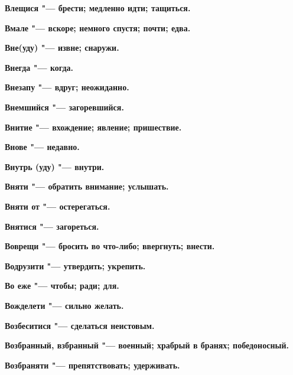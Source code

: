 \begin{mymulticols}{2}
\bfseries Влещися\normalfont{} "--- брести; медленно идти; тащиться. 




\bfseries Вмале\normalfont{} "--- вскоре; немного спустя; почти; едва. 




\bfseries Вне(уду)\normalfont{} "--- извне; снаружи. 




\bfseries Внегда\normalfont{} "--- когда. 




\bfseries Внезапу\normalfont{} "--- вдруг; неожиданно. 




\bfseries Внемшийся\normalfont{} "--- загоревшийся. 




\bfseries Внитие\normalfont{} "--- вхождение; явление; пришествие. 




\bfseries Внове\normalfont{} "--- недавно. 




\bfseries Внутрь (уду)\normalfont{} "--- внутри. 




\bfseries Вняти\normalfont{} "--- обратить внимание; услышать. 




\bfseries Вняти от\normalfont{} "--- остерегаться. 




\bfseries Внятися\normalfont{} "--- загореться. 




\bfseries Воврещи\normalfont{} "--- бросить во что-либо; ввергнуть; внести. 




\bfseries Водрузити\normalfont{} "--- утвердить; укрепить. 




\bfseries Во еже\normalfont{} "--- чтобы; ради; для. 




\bfseries Вожделети\normalfont{} "--- сильно желать. 




\bfseries Возбеситися\normalfont{} "--- сделаться неистовым. 




\bfseries Возбранный, взбранный\normalfont{} "--- военный; храбрый в бранях; победоносный. 




\bfseries Возбраняти\normalfont{} "--- препятствовать; удерживать. 





\end{mymulticols}

